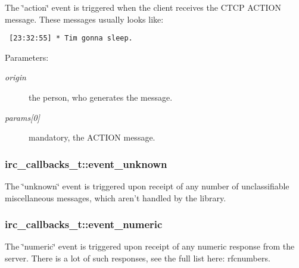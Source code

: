 The \char`\"{}action\char`\"{} event is triggered when the client receives the CTCP ACTION message. These messages usually looks like:\par
 

\begin{Code}\begin{verbatim} [23:32:55] * Tim gonna sleep.
\end{verbatim}
\end{Code}



\begin{Desc}
\item[Parameters:]
\begin{description}
\item[{\em origin}]the person, who generates the message. \item[{\em params\mbox{[}0\mbox{]}}]mandatory, the ACTION message. \end{description}
\end{Desc}
\hypertarget{structirc__callbacks__t_765b4f0a622cedf2c26c1a615414a3a4}{
\subsubsection[event\_\-unknown]{ {\bf irc\_\-callbacks\_\-t::event\_\-unknown}}}
\label{structirc__callbacks__t_765b4f0a622cedf2c26c1a615414a3a4}


The \char`\"{}unknown\char`\"{} event is triggered upon receipt of any number of unclassifiable miscellaneous messages, which aren't handled by the library. \hypertarget{structirc__callbacks__t_85951d45acff22aea37a822bb9c7aef7}{
\subsubsection[event\_\-numeric]{ {\bf irc\_\-callbacks\_\-t::event\_\-numeric}}}
\label{structirc__callbacks__t_85951d45acff22aea37a822bb9c7aef7}


The \char`\"{}numeric\char`\"{} event is triggered upon receipt of any numeric response from the server. There is a lot of such responses, see the full list here: rfcnumbers.

